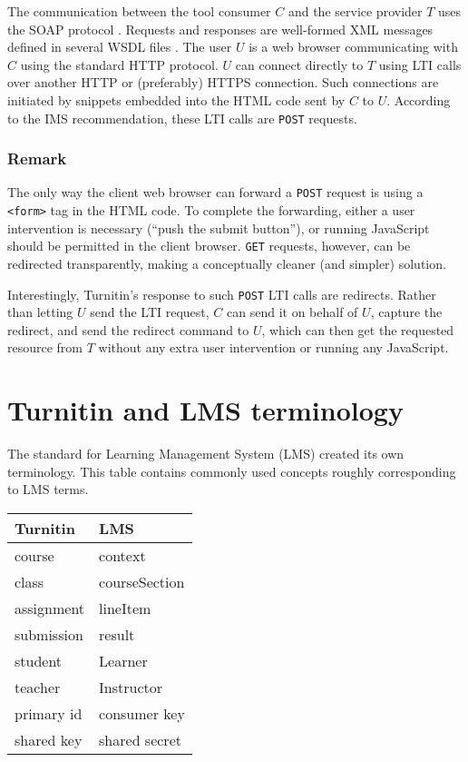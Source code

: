\documentclass{article}
\begin{document}
The communication between the tool consumer $C$ and the service provider $T$
uses the SOAP protocol \cite{soap}. Requests and responses are well-formed
XML messages defined in several WSDL files \cite{wsdl}. The user $U$
is a 
web browser communicating with $C$ using the standard HTTP protocol. $U$ can
connect directly to $T$ using LTI calls over another HTTP or (preferably) HTTPS
connection. Such connections are initiated by
snippets embedded into the HTML code sent by $C$ to $U$. According to the IMS
recommendation, these LTI calls are \verb|POST| requests.

\subsubsection*{Remark}
The only way the client web browser can forward a \verb|POST| request is 
using a \verb|<form>| tag in the HTML code.
To complete the forwarding,
either a user intervention is necessary (``push the submit button''), or 
running JavaScript should be permitted in the client browser.
\verb|GET| requests, however, can be redirected transparently, making a
conceptually cleaner (and simpler) solution.

Interestingly, Turnitin's response to such \verb|POST| LTI calls are 
redirects. Rather than letting $U$ send the LTI request, $C$ can send it on
behalf of $U$, capture the redirect, and send the redirect command to $U$,
which can then get the requested resource from $T$ without any extra user
intervention or running any JavaScript.

\section{Turnitin and LMS terminology}\label{sec:terminology}
The standard for Learning Management System (LMS) created its own terminology.
This table contains commonly used concepts roughly corresponding to LMS terms.
\begin{center}\begin{tabular}{|ll|}
\hline
\rule{0pt}{12pt}Turnitin & LMS \\
\hline
\rule{0pt}{11pt}course & context \\
class      & courseSection \\
assignment & lineItem      \\
submission & result        \\
student    & Learner       \\
teacher    & Instructor    \\
primary id & consumer key  \\
shared key & shared secret \\
\hline
\end{tabular}\end{center} 
\end{document}
